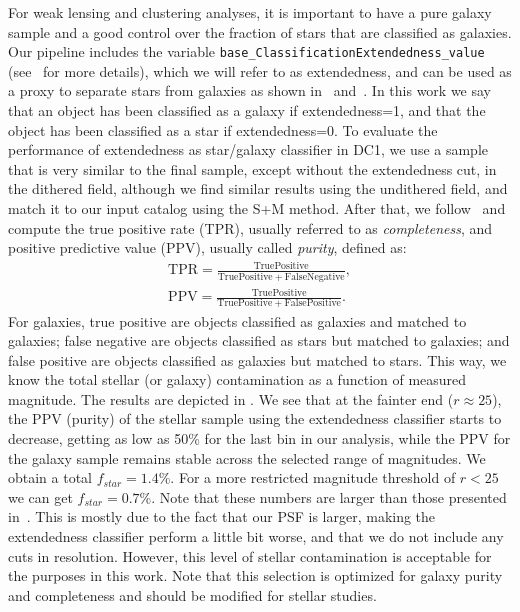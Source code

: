 \documentclass[\docopts]{\docclass}
\begin{document}
For weak lensing and clustering analyses, it is important to have a pure galaxy sample and a good control over the fraction of stars that are classified as galaxies. Our pipeline includes the variable \texttt{base\_ClassificationExtendedness\_value} (see~\citet{2018PASJ...70S...5B} for more details), which we will refer to as extendedness, and can be used as a proxy to separate stars from galaxies as shown in~\citet{2018PASJ...70S..25M} and~\citet{2018PASJ...70S...5B}. In this work we say that an object has been classified as a galaxy if extendedness=1, and that the object has been classified as a star if extendedness=0. To evaluate the performance of extendedness as star/galaxy classifier in DC1, we use a sample that is very similar to the final sample, except without the extendedness cut, in the dithered field, although we find similar results using the undithered field, and match it to our input catalog using the S+M method. After that, we follow~\citet{2018MNRAS.481.5451S} and compute the true positive rate (TPR), usually referred to as \textit{completeness}, and positive predictive value (PPV), usually called \textit{purity}, defined as:
\begin{eqnarray}
\mathrm{TPR} = \frac{\mathrm{True Positive}}{\mathrm{True Positive}+\mathrm{False Negative}}, \\
\mathrm{PPV} = \frac{\mathrm{True Positive}}{\mathrm{True Positive}+\mathrm{False Positive}}.
\end{eqnarray}
For galaxies, true positive are objects classified as galaxies and matched to galaxies; false negative are objects classified as stars but matched to galaxies; and false positive are objects classified as galaxies but matched to stars. This way, we know the total stellar (or galaxy) contamination as a function of measured magnitude. The results are depicted in . We see that at the fainter end ($r \approx 25$), the PPV (purity) of the stellar sample using the extendedness classifier starts to decrease, getting as low as 50\% for the last bin in our analysis, while the PPV for the galaxy sample remains stable across the selected range of magnitudes. We obtain a total $f_{star}=1.4\%$. For a more restricted magnitude threshold of $r < 25$ we can get $f_{star} = 0.7\%$. Note that these numbers are larger than those presented in~\citet{2018PASJ...70S...5B}. This is mostly due to the fact that our PSF is larger, making the extendedness classifier perform a little bit worse, and that we do not include any cuts in resolution. However, this level of stellar contamination is acceptable for the purposes in this work. Note that this selection is optimized for galaxy purity and completeness and should be modified for stellar studies.
\end{document}
